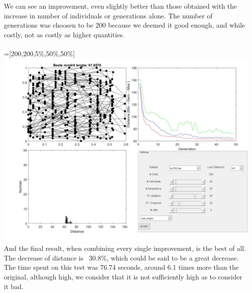 We can see an improvement, even slightly better than those obtained with the
increase in number of individuals or generations alone. The number of
generations was choosen to be 200 because we deemed it good enough, and while
costly, not as costly as higher quantities.\\
\\
 =[200,200,5\%,50\%,50\%] \\
\includegraphics[width=\textwidth]{img/specific/xalt_edges/general_7.jpg}\\
And the final result, when combining every single improvement, is the best of
all. The decrease of distance is ~30.8\%, which could be said to be a great
decrease. The time spent on this test was 76.74 seconds, around 6.1 times
more than the original, although high, we consider that it is not
sufficiently high as to consider it bad. \\
\\

